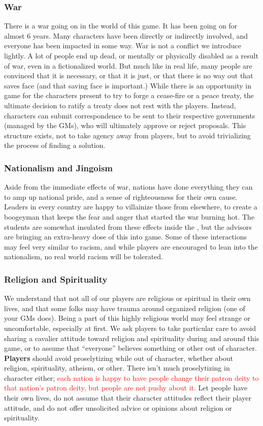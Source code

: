 \documentclass[sheet]{PP}
\begin{document}
\subsubsection{War}
There is a war going on in the world of this game. It has been going on for almost 6 years. Many characters have been directly or indirectly involved, and everyone has been impacted in some way. War is not a conflict we introduce lightly. A lot of people end up dead, or mentally or physically disabled as a result of war, even in a fictionalized world. But much like in real life, many people are convinced that it is necessary, or that it is just, or that there is no way out that saves face (and that saving face is important.) While there is an opportunity in game for the characters present to try to forge a cease-fire or a peace treaty, the ultimate decision to ratify a treaty does not rest with the players. Instead, characters can submit correspondence to be sent to their respective governments (managed by the GMs), who will ultimately approve or reject proposals. This structure exists, not to take agency away from players, but to avoid trivializing the process of finding a solution. 

\subsubsection{Nationalism and Jingoism}
Aside from the immediate effects of war, nations have done everything they can to amp up national pride, and a sense of righteousness for their own cause. Leaders in every country are happy to villainize those from elsewhere, to create a boogeyman that keeps the fear and anger that started the war burning hot. The students are somewhat insulated from these effects inside the \pSchool{}, but the advisors are bringing an extra-heavy dose of this into game. Some of these interactions may feel very similar to racism, and while players are encouraged to lean into the nationalism, no real world racism will be tolerated.

\subsubsection{Religion and Spirituality}
We understand that not all of our players are religious or spiritual in their own lives, and that some folks may have trauma around organized religion (one of your GMs does). Being a part of this highly religious world may feel strange or uncomfortable, especially at first. We ask players to take particular care to avoid sharing a cavalier attitude toward religion and spirituality during and around this game, or to assume that ``everyone'' believes something or other out of character. \textbf{Players} should avoid proselytizing while out of character, whether about religion, spirituality, atheism, or other. There isn't much proselytizing in character either; \textcolor{red}{each nation is happy to have people change their patron deity to that nation's patron deity, but people are not pushy about it.} Let people have their own lives, do not assume that their character attitudes reflect their player attitude, and do not offer unsolicited advice or opinions about religion or spirituality.
\end{document}
